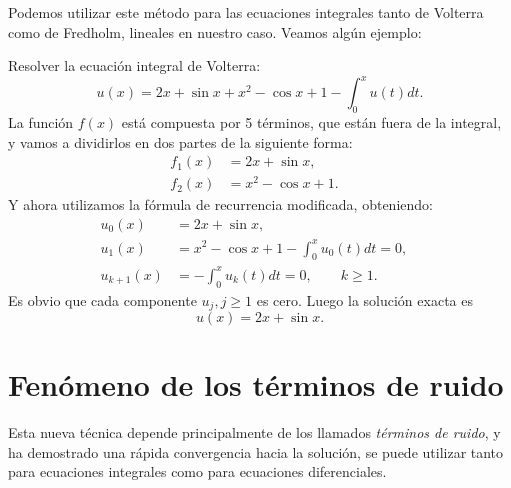 Podemos utilizar este método para las ecuaciones integrales tanto de Volterra como de Fredholm, lineales en nuestro caso. Veamos algún ejemplo:

\begin{ejemplo}
	Resolver la ecuación integral de Volterra:
	\begin{equation}
		u(x) = 2x + \sin x + x^2 - \cos x + 1 - \int_{0}^{x} u(t)dt.
	\end{equation}
	La función $f(x)$ está compuesta por 5 términos, que están fuera de la integral, y vamos a dividirlos en dos partes de la siguiente forma:
	\begin{align}
		f_1(x) &= 2x + \sin x,      &   \\
		f_2(x) &= x^2 - \cos x + 1.    &
	\end{align}
	Y ahora utilizamos la fórmula de recurrencia modificada, obteniendo:
	\begin{align}
		u_0(x) &= 2x + \sin x,      &   \\
		u_{1}(x) &= x^2 - \cos x + 1 - \int_{0}^{x} u_0(t)dt = 0,    &  \\
		u_{k+1}(x) &= - \int_{0}^{x} u_k(t)dt = 0, \qquad k \geqslant 1.    &
	\end{align}
	Es obvio que cada componente $u_j, j \geqslant 1$ es cero. Luego la solución exacta es
	\begin{equation}
		u(x) = 2x + \sin x.
	\end{equation}
\end{ejemplo}

\section{Fenómeno de los términos de ruido}
Esta nueva técnica depende principalmente de los llamados \textit{términos de ruido}, y ha demostrado una rápida convergencia hacia la solución, se puede utilizar tanto para ecuaciones integrales como para ecuaciones diferenciales.

